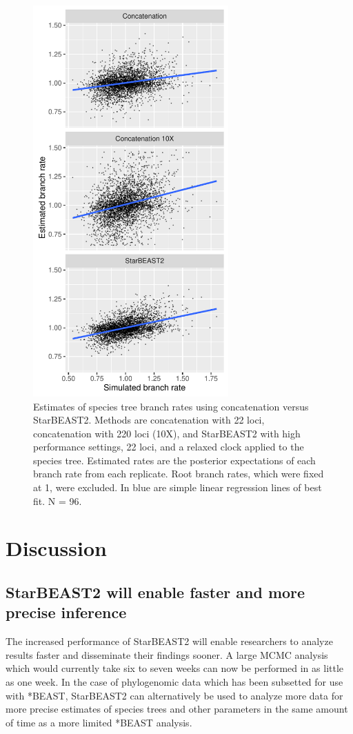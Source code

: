 \documentclass[nogrid]{MBE}%
\begin{document}
\begin{figure}[htb!]
\centering
\includegraphics[width=7.5cm]{branch_rates.pdf}
\caption
{Estimates of species tree branch rates using concatenation versus StarBEAST2.
Methods are concatenation with 22 loci, concatenation with 220 loci (10X), and
StarBEAST2 with high performance settings, 22 loci, and a relaxed clock applied
to the species tree. Estimated rates are the posterior expectations of each
branch rate from each replicate. Root branch rates, which were fixed at 1,
were excluded. In blue are simple linear regression lines of best fit. N = 96.}
\label{fig:branchRates}
\end{figure}

\section{Discussion}

\subsection{StarBEAST2 will enable faster and more precise inference}

The increased performance of StarBEAST2 will enable researchers to analyze
results faster and disseminate their findings sooner. A large MCMC analysis
which would currently take six to seven weeks can now be performed in as little
as one week. In the case of phylogenomic data which has been subsetted for use
with *BEAST, StarBEAST2 can alternatively be used to analyze more data for more
precise estimates of species trees and other parameters in the same amount of
time as a more limited *BEAST analysis.
\end{document}
